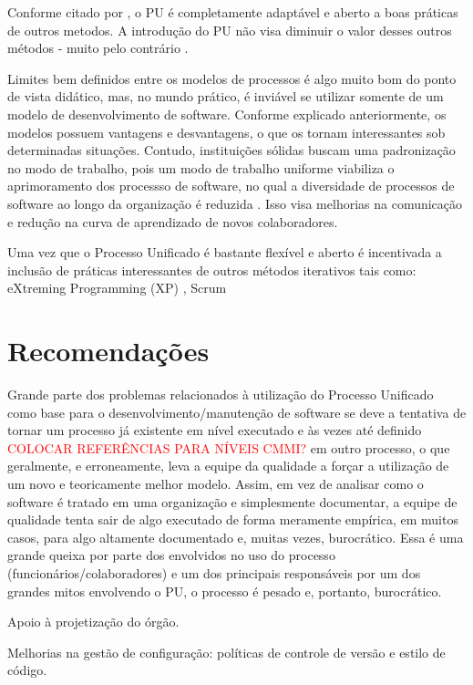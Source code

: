 \documentclass[
	article,			%
	11pt,				%
	oneside,			%
	a4paper,			%
	english,			%
	brazil,				%
	sumario=tradicional
	]{abntex2}
\begin{document}
Conforme citado por , o PU é completamente
adaptável e aberto a boas práticas de outros metodos. A introdução do PU não
visa diminuir o valor desses outros métodos - muito pelo contrário
\cite{larman2007utilizando}.

Limites bem definidos entre os modelos de processos é algo muito bom do ponto de
vista didático, mas, no mundo prático, é inviável se utilizar somente de um
modelo de desenvolvimento de software. Conforme explicado anteriormente, os
modelos possuem vantagens e desvantagens, o que os tornam interessantes sob
determinadas situações. Contudo, instituições sólidas buscam uma padronização no
modo de trabalho, pois um modo de trabalho uniforme viabiliza o aprimoramento
dos processso de software, no qual a diversidade de processos de software ao
longo da organização é reduzida \cite{sommerville2007}. Isso visa melhorias na
comunicação e redução na curva de aprendizado de novos colaboradores.

Uma vez que o Processo Unificado é bastante flexível e aberto é incentivada a
inclusão de práticas interessantes de outros métodos iterativos tais como:
eXtreming Programming (XP) \cite{Beck:1999:ECE:619045.621348}, Scrum
\cite{schwaber2002agile}

\section{Recomendações}

Grande parte dos problemas relacionados à utilização do Processo Unificado como
base para o desenvolvimento/manutenção de software se deve a tentativa de tornar
um processo já existente em nível executado e às vezes até definido
\textcolor{red}{COLOCAR REFERÊNCIAS PARA NÍVEIS CMMI?} em outro processo, o que
geralmente, e erroneamente, leva a equipe da qualidade a forçar a utilização de
um novo e teoricamente melhor modelo. Assim, em vez de analisar como o software
é tratado em uma organização e simplesmente documentar, a equipe de qualidade
tenta sair de algo executado de forma meramente empírica, em muitos casos, para
algo altamente documentado e, muitas vezes, burocrático. Essa é uma grande
queixa por parte dos envolvidos no uso do processo (funcionários/colaboradores)
e um dos principais responsáveis por um dos grandes mitos envolvendo o PU, o
processo é pesado e, portanto, burocrático.



Apoio à projetização
do órgão.

Melhorias na gestão de configuração: políticas de controle de versão e estilo de
código.
\end{document}
